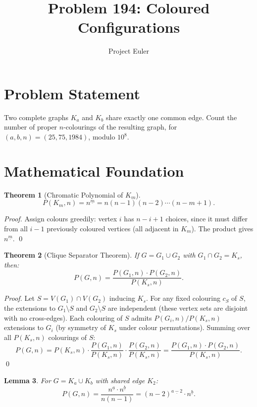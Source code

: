 \documentclass[12pt]{article}
\title{Problem 194: Coloured Configurations}
\author{Project Euler}
\date{}
\newtheorem{theorem}{Theorem}
\newtheorem{lemma}[theorem]{Lemma}
\begin{document}
\maketitle

\section{Problem Statement}

Two complete graphs $K_a$ and $K_b$ share exactly one common edge. Count the number of proper $n$-colourings of the resulting graph, for $(a, b, n) = (25, 75, 1984)$, modulo $10^8$.

\section{Mathematical Foundation}

\begin{theorem}[Chromatic Polynomial of $K_m$]
\[
P(K_m, n) = n^{\underline{m}} = n(n-1)(n-2)\cdots(n-m+1).
\]
\end{theorem}

\begin{proof}
Assign colours greedily: vertex $i$ has $n - i + 1$ choices, since it must differ from all $i-1$ previously coloured vertices (all adjacent in $K_m$). The product gives $n^{\underline{m}}$. \qed
\end{proof}

\begin{theorem}[Clique Separator Theorem]
If $G = G_1 \cup G_2$ with $G_1 \cap G_2 = K_s$, then:
\[
P(G, n) = \frac{P(G_1, n) \cdot P(G_2, n)}{P(K_s, n)}.
\]
\end{theorem}

\begin{proof}
Let $S = V(G_1) \cap V(G_2)$ inducing $K_s$. For any fixed colouring $c_S$ of $S$, the extensions to $G_1 \setminus S$ and $G_2 \setminus S$ are independent (these vertex sets are disjoint with no cross-edges). Each colouring of $S$ admits $P(G_i, n)/P(K_s, n)$ extensions to $G_i$ (by symmetry of $K_s$ under colour permutations). Summing over all $P(K_s, n)$ colourings of $S$:
\[
P(G, n) = P(K_s, n) \cdot \frac{P(G_1, n)}{P(K_s, n)} \cdot \frac{P(G_2, n)}{P(K_s, n)} = \frac{P(G_1, n) \cdot P(G_2, n)}{P(K_s, n)}.
\]
\qed
\end{proof}

\begin{lemma}
For $G = K_a \cup K_b$ with shared edge $K_2$:
\[
P(G, n) = \frac{n^{\underline{a}} \cdot n^{\underline{b}}}{n(n-1)} = (n-2)^{\underline{a-2}} \cdot n^{\underline{b}}.
\]
\end{lemma}
\end{document}
